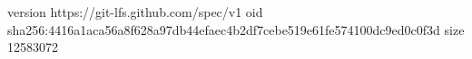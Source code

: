 version https://git-lfs.github.com/spec/v1
oid sha256:4416a1aca56a8f628a97db44efaec4b2df7cebe519e61fe574100dc9ed0c0f3d
size 12583072
